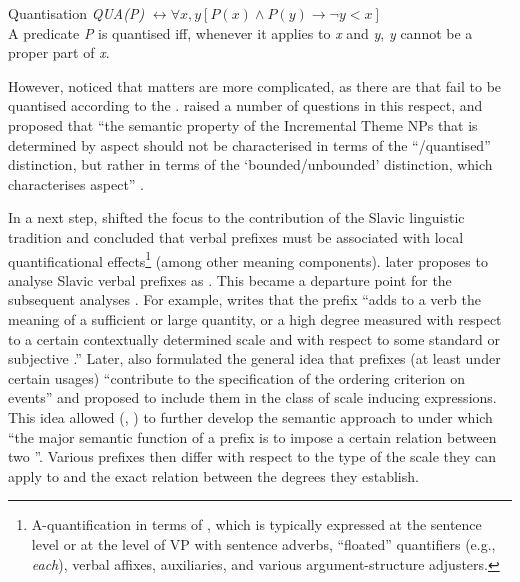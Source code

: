 \theoremstyle{definition}
\begin{definition}{Quantisation}\label{def:quant}
\textit{QUA(P)} $\leftrightarrow \forall x,y[P(x) \wedge P(y) \rightarrow \neg y<x]$\\
A predicate \textit{P} is quantised iff, whenever it applies to \textit{x} and \textit{y}, \textit{y} cannot be a proper part of \textit{x}.
\end{definition}

However, \citet{Filip:92} noticed that matters are more complicated, as there are  that fail to be quantised according to the . \citet{Filip:92} raised a number of questions in this respect, and proposed that ``the semantic property of the Incremental Theme NPs that is determined by aspect should not be characterised in terms of the ``\slash quantised'' distinction, but rather in terms of the `bounded/unbounded' distinction, which characterises aspect'' \citep[][147]{Filip:92}.

In a next step, \citet{Filip:92} shifted the focus to the contribution of the Slavic linguistic tradition \citep{Wierzbicka:67, Rassudova:75, Merrill:85} and concluded that verbal prefixes must be associated with local quantificational effects\footnote{A-quantification in terms of \citealt{BachPartee:87, BachPartee:95}, which is typically expressed at the sentence level or at the level of VP with sentence adverbs, ``floated'' quantifiers (e.g., \textit{each}), verbal affixes, auxiliaries, and various argument-structure adjusters.} (among other meaning components). \citet{Filip:99} later proposes to analyse Slavic verbal prefixes as . This became a departure point for the subsequent analyses \citep{Filip:00, Filip:03, Filip:05, FilipRothstein:05, Kagan:11, Kagan:12, Kagan:13, Kagan:book}. For example, \citet[183]{Filip:99} writes that the prefix  ``adds to a verb the meaning of a sufficient or large quantity, or a high degree measured with respect to a certain contextually determined scale and with respect to some standard or subjective .'' Later, \citet{Filip:08} also formulated the general idea that prefixes (at least under certain usages) ``contribute to the specification of the ordering criterion on events'' and proposed to include them in the class of scale inducing expressions. This idea allowed \citeauthor{Kagan:12} (\citeyear{Kagan:12}, \citeyear{Kagan:book}) to further develop the semantic approach to  under which ``the major semantic function of a prefix is to impose a certain relation between two ''. Various prefixes then differ with respect to the type of the scale they can apply to and the exact relation between the degrees  they establish.\largerpage[2]

